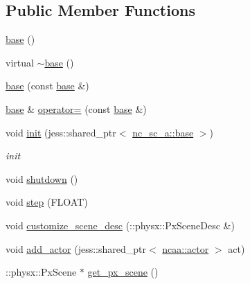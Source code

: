 \subsection*{Public Member Functions}
\begin{DoxyCompactItemize}
\item 
\hyperlink{classnebula_1_1content_1_1scene_1_1physics_1_1physx_1_1base_a7836f85b5d614cda501a7bf327dbf7d4}{base} ()
\item 
virtual \hyperlink{classnebula_1_1content_1_1scene_1_1physics_1_1physx_1_1base_a30bdf071f30320b0408989d9735d5f17}{$\sim$base} ()
\item 
\hyperlink{classnebula_1_1content_1_1scene_1_1physics_1_1physx_1_1base_a673ce31a72310cd821bef9b717f3e139}{base} (const \hyperlink{classnebula_1_1content_1_1scene_1_1physics_1_1physx_1_1base}{base} \&)
\item 
\hyperlink{classnebula_1_1content_1_1scene_1_1physics_1_1physx_1_1base}{base} \& \hyperlink{classnebula_1_1content_1_1scene_1_1physics_1_1physx_1_1base_a99e5ed530c33163792b0c8b112360dc3}{operator=} (const \hyperlink{classnebula_1_1content_1_1scene_1_1physics_1_1physx_1_1base}{base} \&)
\item 
void \hyperlink{classnebula_1_1content_1_1scene_1_1physics_1_1physx_1_1base_a472a4fa7d840b99f2a201ca2653c645c}{init} (jess::shared\_\-ptr$<$ \hyperlink{classnebula_1_1content_1_1scene_1_1admin_1_1base}{nc\_\-sc\_\-a::base} $>$)
\begin{DoxyCompactList}\small\item\em init \item\end{DoxyCompactList}\item 
void \hyperlink{classnebula_1_1content_1_1scene_1_1physics_1_1physx_1_1base_ac445f0b82db1cb5aa6f8a79990a4bab2}{shutdown} ()
\item 
void \hyperlink{classnebula_1_1content_1_1scene_1_1physics_1_1physx_1_1base_a5b01976e1b4bf923019deca1bce6af2a}{step} (FLOAT)
\item 
void \hyperlink{classnebula_1_1content_1_1scene_1_1physics_1_1physx_1_1base_a618ce3799aad85fc3fe0304c8af9a236}{customize\_\-scene\_\-desc} (::physx::PxSceneDesc \&)
\item 
void \hyperlink{classnebula_1_1content_1_1scene_1_1physics_1_1physx_1_1base_ab4a8bf780b82fe261cb143431e989299}{add\_\-actor} (jess::shared\_\-ptr$<$ \hyperlink{classnebula_1_1content_1_1actor_1_1admin_1_1actor}{ncaa::actor} $>$ act)
\item 
::physx::PxScene $\ast$ \hyperlink{classnebula_1_1content_1_1scene_1_1physics_1_1physx_1_1base_a9b165825bcc08fc22cd44914f10fce09}{get\_\-px\_\-scene} ()
\end{DoxyCompactItemize}
